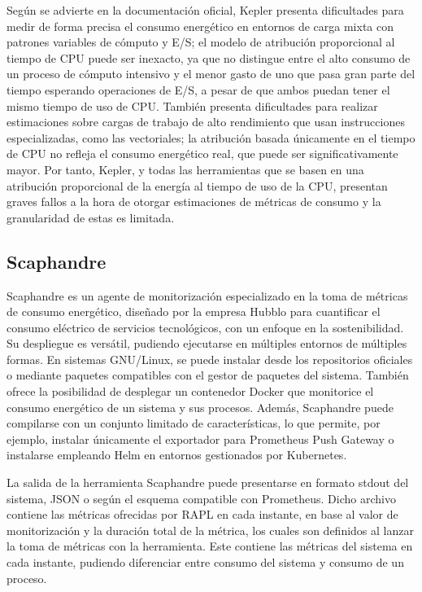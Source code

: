  Según se advierte en la documentación oficial, Kepler presenta dificultades para medir de forma precisa el consumo energético en entornos de carga mixta con patrones variables de cómputo y E/S; el modelo de atribución proporcional al tiempo de CPU puede ser inexacto, ya que no distingue entre el alto consumo de un proceso de cómputo intensivo y el menor gasto de uno que pasa gran parte del tiempo esperando operaciones de E/S, a pesar de que ambos puedan tener el mismo tiempo de uso de CPU. También presenta dificultades para realizar estimaciones sobre cargas de trabajo de alto rendimiento que usan instrucciones especializadas, como las vectoriales; la atribución basada únicamente en el tiempo de CPU no refleja el consumo energético real, que puede ser significativamente mayor. Por tanto, Kepler, y todas las herramientas que se basen en una atribución proporcional de la energía al tiempo de uso de la CPU, presentan graves fallos a la hora de otorgar estimaciones de métricas de consumo y la granularidad de estas es limitada.
  
\subsection*{Scaphandre}\label{arte-herr-scp}
  Scaphandre es un agente de monitorización especializado en la toma de métricas de consumo energético, diseñado por la empresa Hubblo para cuantificar el consumo eléctrico de servicios tecnológicos, con un enfoque en la sostenibilidad. Su despliegue es versátil, pudiendo ejecutarse en múltiples entornos de múltiples formas. En sistemas GNU/Linux, se puede instalar desde los repositorios oficiales o mediante paquetes compatibles con el gestor de paquetes del sistema. También ofrece la posibilidad de desplegar un contenedor Docker que monitorice el consumo energético de un sistema y sus procesos. Además, Scaphandre puede compilarse con un conjunto limitado de características, lo que permite, por ejemplo, instalar únicamente el exportador para Prometheus Push Gateway o instalarse empleando Helm en entornos gestionados por Kubernetes.
  
  La salida de la herramienta Scaphandre puede presentarse en formato stdout del sistema, JSON o según el esquema compatible con Prometheus. Dicho archivo contiene las métricas ofrecidas por RAPL en cada instante, en base al valor de monitorización y la duración total de la métrica, los cuales son definidos al lanzar la toma de métricas con la herramienta. Este contiene las métricas del sistema en cada instante, pudiendo diferenciar entre consumo del sistema y consumo de un proceso.
  
